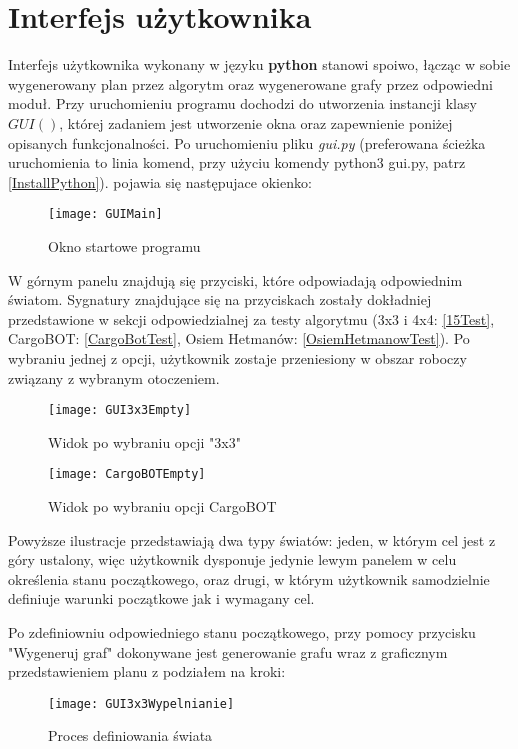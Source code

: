 \section{Interfejs użytkownika}
    \label{GUIRozdzial}
    Interfejs użytkownika wykonany w języku \textbf{python} stanowi spoiwo, łącząc w sobie wygenerowany plan przez algorytm oraz wygenerowane grafy przez 
    odpowiedni moduł. Przy uruchomieniu programu dochodzi do utworzenia instancji klasy $GUI()$, której zadaniem jest utworzenie okna oraz zapewnienie 
    poniżej opisanych funkcjonalności.
    Po uruchomieniu pliku \textit{gui.py} (preferowana ścieżka uruchomienia to linia komend, przy użyciu komendy python3 gui.py, patrz \ref{InstallPython}).
    pojawia się następujace okienko:
    \begin{figure}[H]
        \texttt{[image: GUIMain]}
        \centering
        \caption{Okno startowe programu}
    \end{figure}

    W górnym panelu znajdują się przyciski, które odpowiadają odpowiednim światom. Sygnatury znajdujące się na przyciskach zostały 
    dokładniej przedstawione w sekcji odpowiedzialnej za testy algorytmu (3x3 i 4x4: \ref{15Test}, CargoBOT: \ref{CargoBotTest}, 
    Osiem Hetmanów: \ref{OsiemHetmanowTest}). Po wybraniu jednej z opcji, użytkownik zostaje przeniesiony w obszar roboczy związany z wybranym
    otoczeniem.

    \begin{figure}[H]
        \texttt{[image: GUI3x3Empty]}
        \centering
        \caption{Widok po wybraniu opcji "3x3"}
    \end{figure}

    \begin{figure}[H]
        \texttt{[image: CargoBOTEmpty]}
        \centering
        \caption{Widok po wybraniu opcji CargoBOT}
    \end{figure}

    Powyższe ilustracje przedstawiają dwa typy światów: jeden, w którym cel jest z góry ustalony, więc użytkownik dysponuje jedynie lewym panelem w 
    celu określenia stanu początkowego, oraz drugi, w którym użytkownik samodzielnie definiuje warunki początkowe jak i wymagany cel.

    Po zdefiniowniu odpowiedniego stanu początkowego, przy pomocy przycisku "Wygeneruj graf" dokonywane jest generowanie grafu wraz z graficznym 
    przedstawieniem planu z podziałem na kroki:

    \begin{figure}[H]
        \texttt{[image: GUI3x3Wypelnianie]}
        \centering
        \caption{Proces definiowania świata}
    \end{figure}

